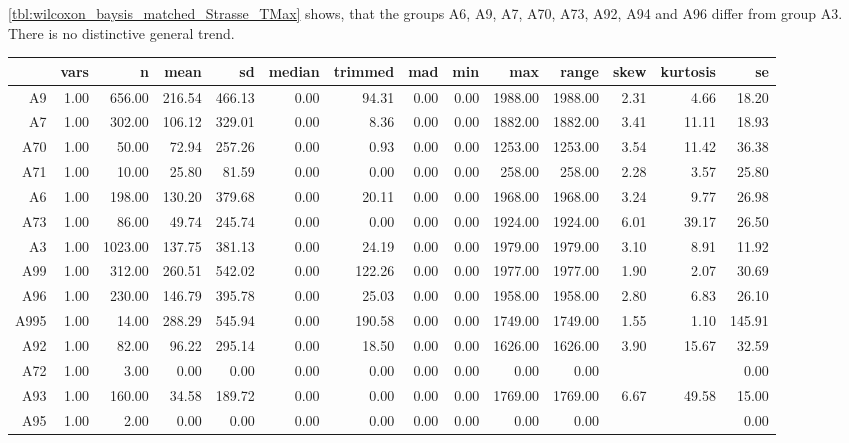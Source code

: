 \cref{tbl:wilcoxon_baysis_matched_Strasse_TMax} shows, that the groups A6, A9, A7, A70, A73, A92, A94 and A96 differ from group A3. There is no distinctive general trend.
\begin{table}[ht!]
	\tiny
	\centering
  \begin{tabular}{rrrrrrrrrrrrrr}
    \hline
    & vars & n & mean & sd & median & trimmed & mad & min & max & range & skew & kurtosis & se \\ 
    \hline
    A9   & 1.00 & 656.00 & 216.54 & 466.13 & 0.00 & 94.31 & 0.00 & 0.00 & 1988.00 & 1988.00 & 2.31 & 4.66 & 18.20 \\ 
    A7   & 1.00 & 302.00 & 106.12 & 329.01 & 0.00 & 8.36 & 0.00 & 0.00 & 1882.00 & 1882.00 & 3.41 & 11.11 & 18.93 \\ 
    A70  & 1.00 & 50.00 & 72.94 & 257.26 & 0.00 & 0.93 & 0.00 & 0.00 & 1253.00 & 1253.00 & 3.54 & 11.42 & 36.38 \\ 
    A71  & 1.00 & 10.00 & 25.80 & 81.59 & 0.00 & 0.00 & 0.00 & 0.00 & 258.00 & 258.00 & 2.28 & 3.57 & 25.80 \\ 
    A6   & 1.00 & 198.00 & 130.20 & 379.68 & 0.00 & 20.11 & 0.00 & 0.00 & 1968.00 & 1968.00 & 3.24 & 9.77 & 26.98 \\ 
    A73  & 1.00 & 86.00 & 49.74 & 245.74 & 0.00 & 0.00 & 0.00 & 0.00 & 1924.00 & 1924.00 & 6.01 & 39.17 & 26.50 \\ 
    A3   & 1.00 & 1023.00 & 137.75 & 381.13 & 0.00 & 24.19 & 0.00 & 0.00 & 1979.00 & 1979.00 & 3.10 & 8.91 & 11.92 \\ 
    A99  & 1.00 & 312.00 & 260.51 & 542.02 & 0.00 & 122.26 & 0.00 & 0.00 & 1977.00 & 1977.00 & 1.90 & 2.07 & 30.69 \\ 
    A96  & 1.00 & 230.00 & 146.79 & 395.78 & 0.00 & 25.03 & 0.00 & 0.00 & 1958.00 & 1958.00 & 2.80 & 6.83 & 26.10 \\ 
    A995 & 1.00 & 14.00 & 288.29 & 545.94 & 0.00 & 190.58 & 0.00 & 0.00 & 1749.00 & 1749.00 & 1.55 & 1.10 & 145.91 \\ 
    A92  & 1.00 & 82.00 & 96.22 & 295.14 & 0.00 & 18.50 & 0.00 & 0.00 & 1626.00 & 1626.00 & 3.90 & 15.67 & 32.59 \\ 
    A72  & 1.00 & 3.00 & 0.00 & 0.00 & 0.00 & 0.00 & 0.00 & 0.00 & 0.00 & 0.00 &  &  & 0.00 \\ 
    A93  & 1.00 & 160.00 & 34.58 & 189.72 & 0.00 & 0.00 & 0.00 & 0.00 & 1769.00 & 1769.00 & 6.67 & 49.58 & 15.00 \\ 
    A95  & 1.00 & 2.00 & 0.00 & 0.00 & 0.00 & 0.00 & 0.00 & 0.00 & 0.00 & 0.00 &  &  & 0.00 \\ 

\end{tabular}
\end{table}
